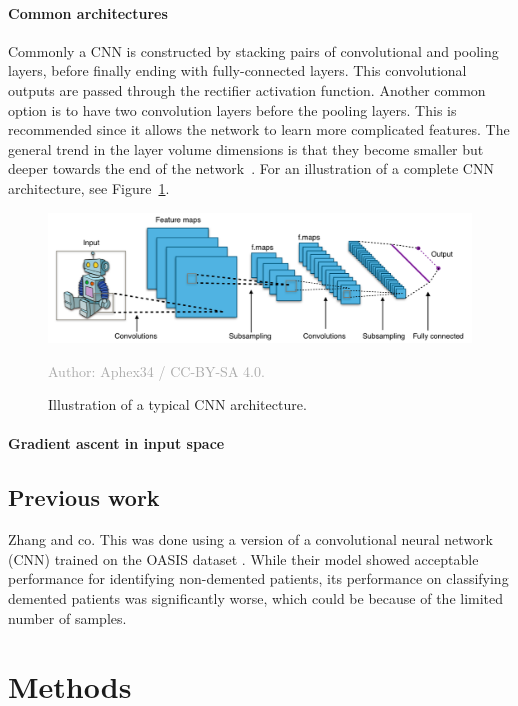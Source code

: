 \documentclass{kththesis}
\newcommand{\source}[1]{\vspace{-5mm}\caption*{\textcolor{darkgray}{Author: {#1}}\vspace{-7mm}} }
\begin{document}
\subsubsection{Common architectures}
Commonly a CNN is constructed by stacking pairs of convolutional and pooling layers, before finally ending with fully-connected layers. This convolutional outputs are passed through the rectifier activation function. Another common option is to have two convolution layers before the pooling layers. This is recommended since it allows the network to learn more complicated features. The general trend in the layer volume dimensions is that they become smaller but deeper towards the end of the network~\cite{cnnIntro}. For an illustration of a complete CNN architecture, see Figure~\ref{fig:typical_cnn}.

\begin{figure}
  \begin{center}
    \includegraphics[width=150mm]{img/typical_cnn.png}
    \caption{Illustration of a typical CNN architecture.}
    \source{Aphex34 / CC-BY-SA 4.0.}
    \label{fig:typical_cnn}
  \end{center}
\end{figure}

\subsubsection{Gradient ascent in input space}

\section{Previous work}
Zhang and co.
This was done using a version of a convolutional neural network (CNN) trained on the OASIS dataset \parencite{oasis}. While their model showed acceptable performance for identifying non-demented patients, its performance on classifying demented patients was significantly worse, which could be because of the limited number of samples.

\chapter{Methods}
\end{document}
